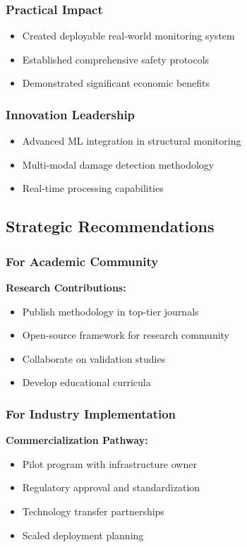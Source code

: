 \documentclass[12pt,a4paper]{article}
\begin{document}
\subsubsection{Practical Impact}
\begin{itemize}
    \item Created deployable real-world monitoring system
    \item Established comprehensive safety protocols
    \item Demonstrated significant economic benefits
\end{itemize}

\subsubsection{Innovation Leadership}
\begin{itemize}
    \item Advanced ML integration in structural monitoring
    \item Multi-modal damage detection methodology
    \item Real-time processing capabilities
\end{itemize}

\subsection{Strategic Recommendations}

\subsubsection{For Academic Community}

\textbf{Research Contributions:}
\begin{itemize}
    \item Publish methodology in top-tier journals
    \item Open-source framework for research community
    \item Collaborate on validation studies
    \item Develop educational curricula
\end{itemize}

\subsubsection{For Industry Implementation}

\textbf{Commercialization Pathway:}
\begin{itemize}
    \item Pilot program with infrastructure owner
    \item Regulatory approval and standardization
    \item Technology transfer partnerships
    \item Scaled deployment planning
\end{itemize}
\end{document}
